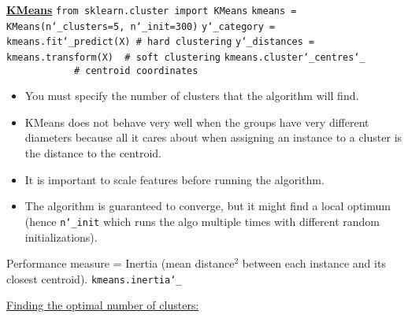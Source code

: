 \underline{\textbf{KMeans}}\newline
\texttt{from sklearn.cluster import KMeans}\newline
\texttt{kmeans = KMeans(n\char`_clusters=5, n\char`_init=300)}\newline
\texttt{y\char`_category  = kmeans.fit\char`_predict(X) \# hard clustering}\newline
\texttt{y\char`_distances = kmeans.transform(X) ~\# soft clustering}\newline
\texttt{kmeans.cluster\char`_centres\char`_ ~~~~~~~~~~~~\# centroid coordinates}

\vspace{-3.0mm}
\begin{itemize}
\item
You must specify the number of clusters that the algorithm will find.
\item
KMeans does not behave very well when the groups have very different diameters because all it cares about
when assigning an instance to a cluster is the distance to the centroid.
\item
It is important to scale features before running the algorithm.
\item
The algorithm is guaranteed to converge, but it might find a local optimum\newline
(hence \texttt{n\char`_init} which runs the algo multiple times with different random initializations).
\end{itemize}

\vspace{-3.0mm}
Performance measure = Inertia (mean distance$^2$ between each instance and its closest centroid).\newline
\texttt{kmeans.inertia\char`_}\newline

\underline{Finding the optimal number of clusters:}

